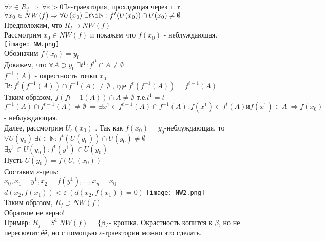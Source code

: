 \documentclass[12pt,a4paper]{article}
\begin{document}
\(\forall r \in R_f \Rightarrow \ \forall \varepsilon >0 \exists \varepsilon\)-траектория, прохлдящая через т. r.
\\
\(\forall x_0 \in NW(f) \Rightarrow \forall U(x_0) \ \exists t \i\mathbb{N} : f^t(U(x_0))\cap U(x_0)\neq \emptyset\) \\
Предположим, что \(R_f \supset NW(f)\) \\
Рассмотрим \(x_0 \in NW(f)\) и покажем что \(f(x_0)\) - неблуждающая. \\
\texttt{[image: NW.png]}\\
Обозначим \(f(x_0) = y_0\)\\
Докажем, что \(\forall A \supset y_0 \ \exists t^1 : f^{t^1}\cap A \neq \emptyset\)\\
\(f^{-1}(A)\) - окрестность точки \(x_0\)\\
\( \exists t : f^t(f^{-1}(A))\cap f^{-1}(A) \neq \emptyset\) , где \(f^t(f^{-1}(A)) = f^{t-1}(A)\)
\\
Таким образом, \(f(f{t-1}(A)) \cap A \neq \emptyset\) т.е.\(t^1 = t\)\\
\(f^{-1}(A) \cap f^{t-1}(A) \neq \emptyset \ \Rightarrow \exists x^1 \in f^{t-1}(A) \cap f^{-1}(A): f(x^1)\in f^t(A) и f(x^1)\in A \ \Rightarrow f(x_0)\)- неблуждающая. \\
Далее, рассмотрим \(U_\varepsilon (x_0)\) . Так как \(f(x_0)=y_0\)-неблуждающая, то \(\forall U(y_0) \ \exists t\in \mathbb{N}: f^t(U(y_0))\cap U(y_0) \neq \emptyset\)\\
\( \exists y^1\in U(y_0): f^t(y^1)\in U(y_0)\)\\
Пусть \(U(y_0)=f(U_\varepsilon (x_0))\) \\
Составим \(\varepsilon\)-цепь: \\
\(x_0,x_1 = y^1,x_2 = f(y^1),...,x_n=x_0 \)\\
\(d(x_2,f(x_1))<\varepsilon \ (d(x_2,f(x_1))=0)\)
\texttt{[image: NW2.png]}\\
Таким образом, \(R_f\supset NW(f)\)\\
Обратное не верно! \\
Пример: \(R_f = S^1 \ NW(f)=\{\beta\}\)- крошка. Окрастность копится к \(\beta\), но не перескочит ёё, но с помощью \(\varepsilon\)-траектории можно это сделать. 
\newpage
\end{document}
